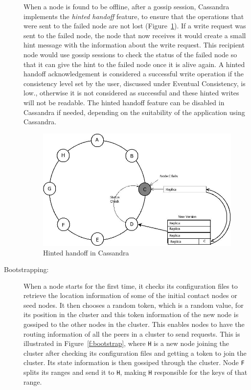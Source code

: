 \begin{description}
When a node is found to be offline, after a gossip session, Cassandra implements
the \textit{hinted handoff} feature, to ensure that the operations that were
sent to the failed node are not lost (Figure~\ref{f:hinted handoff}). If a write
request was sent to the failed node, the node that now receives it would create
a small hint message with the information about the write request. This
recipient node would use gossip sessions to check the status of the failed node
so that it can give the hint to the failed node once it is alive again. A hinted
handoff acknowledgement is
considered a successful write operation if the consistency level set by the
user, discussed under Eventual Consistency, is low., otherwise it is not
considered as successful and these hinted writes will not be readable. The
hinted handoff feature can be disabled in Cassandra if needed, depending on the
suitability of the application using Cassandra.
\begin{figure}[h] 
	\centering
	\includegraphics[width=.6\textwidth]{./figure/Cassandra/Hinted-handoff.png}
	\caption{Hinted handoff in Cassandra}\label{f:hinted handoff}
\end{figure}

\item[Bootstrapping:] When a node starts for the first time, it checks its
configuration files to retrieve the location information of some of the
initial contact nodes or seed nodes.  It then chooses a random token, which is a
random value, for its position in the cluster and this token information of the
new node is gossiped to the other nodes in the cluster. This enables nodes to
have the routing information of all the peers in a cluster to send requests.
This is illustrated in Figure~\ref{f:bootstrap}, where \texttt{H} is a new node
joining the cluster after checking its configuration files and getting a token to join
the cluster. Its state information is then gossiped through the cluster. Node
\texttt{F} splits its ranges and send it to \texttt{H}, making \texttt{H}
responsible for the keys of that range.


\end{description}
